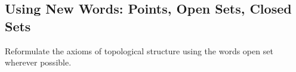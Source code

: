 \subsection{Using New Words: Points, Open Sets, Closed Sets}
\begin{majorEx} %
  Reformulate the axioms of topological structure using the words open
  set wherever possible.
\end{majorEx}